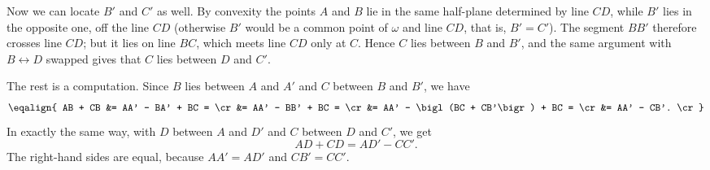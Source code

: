 {    Now we can locate $B'$ and $C'$ as well. By convexity the points $A$ and $B$ lie in the same half-plane determined by line $CD$, while $B'$ lies in the opposite one, off the line $CD$ (otherwise $B'$ would be a common point of $\omega$ and line $CD$, that is, $B' = C'$). The segment $BB'$ therefore crosses line $CD$; but it lies on line $BC$, which meets line $CD$ only at $C$. Hence $C$ lies between $B$ and $B'$, and the same argument with $B \leftrightarrow D$ swapped gives that $C$ lies between $D$ and $C'$.

    The rest is a computation. Since $B$ lies between $A$ and $A'$ and $C$ between $B$ and $B'$, we have
    $$
    \eqalign{
    AB + CB &= AA' - BA' + BC = \cr
    &= AA' - BB' + BC = \cr
    &= AA' - \bigl(BC + CB'\bigr) + BC = \cr
    &= AA' - CB'. \cr
    }
    $$
    In exactly the same way, with $D$ between $A$ and $D'$ and $C$ between $D$ and $C'$, we get
    $$
    AD + CD = AD' - CC'.
    $$
    The right-hand sides are equal, because $AA' = AD'$ and $CB' = CC'$.
}

